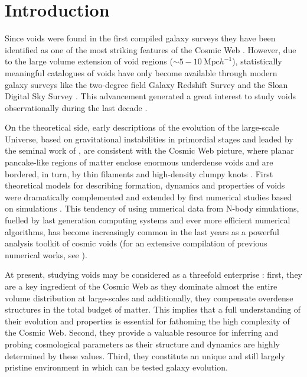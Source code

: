 \documentclass[a4,useAMS,usenatbib,usegraphicx]{latex/mn2e}
\begin{document}
\section{Introduction}
\label{sec:introduction}


Since voids were found in the first compiled galaxy surveys 
they have been identified as one of the most striking features of the
Cosmic Web \citep{Chincarini75,  Gregory78, Einasto80M, Einasto80N,
  Kirshner81,  Kirshner87, Bond96}. 
However,  due to the large volume extension of void regions ($\sim
5-10\ \mbox{Mpc}  h^{-1}$), statistically meaningful catalogues of
voids \citep{Pan10,  Sutter12b, Nadathur14} have only become available
through  modern galaxy surveys like the two-degree field Galaxy
Redshift Survey \citep{ Colless01, Colless03} and the Sloan Digital
Sky Survey \citep{York00, Abazajian03}.
This advancement generated a great interest to study voids
observationally during the last decade \citep{Hoyle04, Croton04, Rojas05,
  Ceccarelli06, Patiri06a, Tikhonov06, Patiri06b,Tikhonov07,
  BendaBeckmann08, Foster09, Ceccarelli13, Sutter14a}. 


On the theoretical side, early descriptions of the evolution of the 
large-scale Universe, based on gravitational instabilities in primordial 
stages and leaded by the seminal work of \citet{Zeldovich70}, are 
consistent with the Cosmic Web picture, where planar pancake-like regions 
of matter enclose enormous underdense voids and are bordered, in turn, by 
thin filaments and high-density clumpy knots \citep{Bond96}. First 
theoretical models for describing formation, dynamics and properties of 
voids \citep{Hoffman82, Icke84, Bertschinger85, Blumenthal92} were 
dramatically complemented and extended by first numerical studies based 
on simulations \citep{Martel90, Regos91, Weygaert93, Dubinski93}. This 
tendency of using numerical data from N-body simulations, fuelled by last 
generation computing systems and ever more efficient numerical algorithms, 
has become increasingly common in the last years as a powerful analysis 
toolkit of cosmic voids (for an extensive compilation of previous 
numerical works, see \citet{Colberg08}).


At present, studying voids may be considered as a threefold enterprise
\citep{Platen07}: first, they are a key ingredient of the Cosmic Web as 
they dominate almost the entire volume distribution at large-scales and 
additionally, they compensate overdense structures in the total budget of 
matter. This implies that a full understanding of their evolution and 
properties is essential for fathoming the high complexity of the Cosmic 
Web. Second, they provide a valuable resource for inferring and probing 
cosmological parameters as their structure and dynamics are highly 
determined by these values. Third, they constitute an unique and still 
largely pristine environment in which can be tested galaxy evolution.
\end{document}
